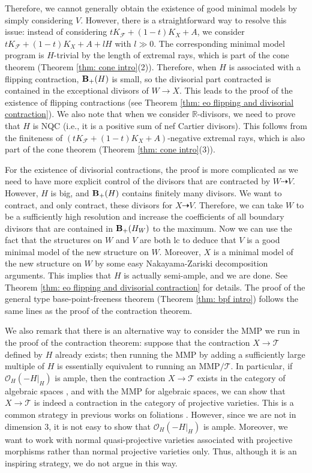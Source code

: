 \documentclass[12pt]{amsart}
\numberwithin{equation}{section}
\newcommand{\Rr}{\mathbb{R}}
\newcommand{\Bb}{{\bf{B}}}
\newcommand{\Ff}{\mathcal{F}}
\theoremstyle{definition}
\theoremstyle{definition}
\theoremstyle{definition}
\begin{document}
Therefore, we cannot generally obtain the existence of good minimal models by simply considering $V$. However, there is a straightforward way to resolve this issue: instead of considering $tK_{\Ff}+(1-t)K_X+A$, we consider $tK_{\Ff}+(1-t)K_X+A+lH$ with $l \gg 0$. The corresponding minimal model program is $H$-trivial by the length of extremal rays, which is part of the cone theorem (Theorem \ref{thm: cone intro}(2)). Therefore, when $H$ is associated with a flipping contraction, $\Bb_+(H)$ is small, so the divisorial part contracted is contained in the exceptional divisors of $W \rightarrow X$. This leads to the proof of the existence of flipping contractions (see Theorem \ref{thm: eo flipping and divisorial contraction}). We also note that when we consider $\Rr$-divisors, we need to prove that $H$ is NQC (i.e., it is a positive sum of nef Cartier divisors). This follows from the finiteness of $(tK_{\Ff}+(1-t)K_X+A)$-negative extremal rays, which is also part of the cone theorem (Theorem \ref{thm: cone intro}(3)).

For the existence of divisorial contractions, the proof is more complicated as we need to have more explicit control of the divisors that are contracted by $W \dashrightarrow V$. However, $H$ is big, and $\Bb_+(H)$ contains finitely many divisors. We want to contract, and only contract, these divisors for $X \dashrightarrow V$. Therefore, we can take $W$ to be a sufficiently high resolution and increase the coefficients of all boundary divisors that are contained in $\Bb_+(H_W)$ to the maximum. Now we can use the fact that the structures on $W$ and $V$ are both lc to deduce that $V$ is a good minimal model of the new structure on $W$. Moreover, $X$ is a minimal model of the new structure on $W$ by some easy Nakayama-Zariski decomposition arguments. This implies that $H$ is actually semi-ample, and we are done. See Theorem \ref{thm: eo flipping and divisorial contraction} for details. The proof of the general type base-point-freeness theorem (Theorem \ref{thm: bpf intro}) follows the same lines as the proof of the contraction theorem.

We also remark that there is an alternative way to consider the MMP we run in the proof of the contraction theorem: suppose that the contraction $X\rightarrow \mathcal{T}$ defined by $H$ already exists; then running the MMP by adding a sufficiently large multiple of $H$ is essentially equivalent to running an MMP$/\mathcal{T}$. In particular, if $\mathcal{O}_H(-H|_H)$ is ample, then the contraction $X \rightarrow \mathcal{T}$ exists in the category of algebraic spaces \cite[Theorem 6.2]{Art70}, and with the MMP for algebraic spaces, we can show that $X \rightarrow \mathcal{T}$ is indeed a contraction in the category of projective varieties. This is a common strategy in previous works on foliations \cite{CS20,CS21,Spi20}. However, since we are not in dimension $3$, it is not easy to show that $\mathcal{O}_H(-H|_H)$ is ample. Moreover, we want to work with normal quasi-projective varieties associated with projective morphisms rather than normal projective varieties only. Thus, although it is an inspiring strategy, we do not argue in this way.
\end{document}
